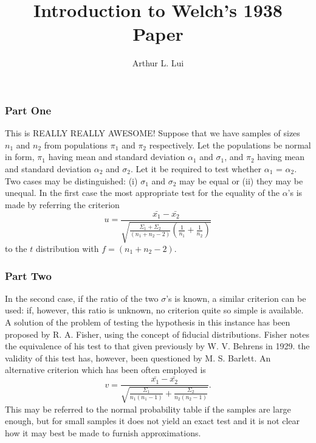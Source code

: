 \documentclass{beamer}
\title%
{
       Introduction to Welch's 1938 Paper
}
\author[Arthur Lui]{Arthur L. Lui\inst{1}}
\institute[Brigham Young University]{
  \inst{1}
  Department of Statistics\\
  Brigham Young University
}
\begin{document}
  \begin{frame}
    \titlepage
  \end{frame}

  \begin{frame}
  \frametitle{Part One}
    This is REALLY REALLY AWESOME!
    Suppose that we have samples of sizes $n_1$ and $n_2$ from 
    populations $\pi_1$ and $\pi_2$ respectively. Let the populations be normal in
    form, $\pi_1$ having mean and standard deviation $\alpha_1$ and $\sigma_1$, and
    $\pi_2$ having mean and standard deviation $\alpha_2$ and $\sigma_2$. 
    Let it be required to test whether $\alpha_1$ = $\alpha_2$.  
    Two cases may be distinguished: (i) $\sigma_1$ and $\sigma_2$ may be equal 
    or (ii) they may be unequal. In the first case the most appropriate test 
    for the equality of the $\alpha$'s is made by referring the criterion
    \begin{equation}
      u = \frac{\bar{x_1}-\bar{x_2}}
      {\sqrt{\frac{\Sigma_1+\Sigma_2}{(n_1+n_2-2)}
      \left(\frac{1}{n_1}+\frac{1}{n_2}\right)}}
    \end{equation}
    to the $t$ distribution with $f=(n_1+n_2-2)$.
  \end{frame}

  \begin{frame}
  \frametitle{Part Two}
    In the second case, if the ratio of the two $\sigma$'s is known, 
    a similar criterion can be used: if, however, this ratio is unknown,
    no criterion quite so simple is available. A solution of the problem
    of testing the hypothesis in this instance has been proposed by R. A. Fisher,
    using the concept of fiducial distributions. Fisher notes the equivalence of his
    test to that given previously by W. V. Behrens in 1929. the validity of this
    test has, however, been questioned by M. S. Barlett. An alternative criterion
    which has been often employed is
    \begin{equation}
    v = \frac{\bar{x_1}-\bar{x_2}}
    {\sqrt{\frac{\Sigma_1}{n_1(n_1-1)}+\frac{\Sigma_2}{n_2(n_2-1)}}}.
    \end{equation}
    This may be referred to the normal probability table if the samples are large
    enough, but for small samples it does not yield an exact test and it is not
    clear how it may best be made to furnish approximations.
  \end{frame}
\end{document}
